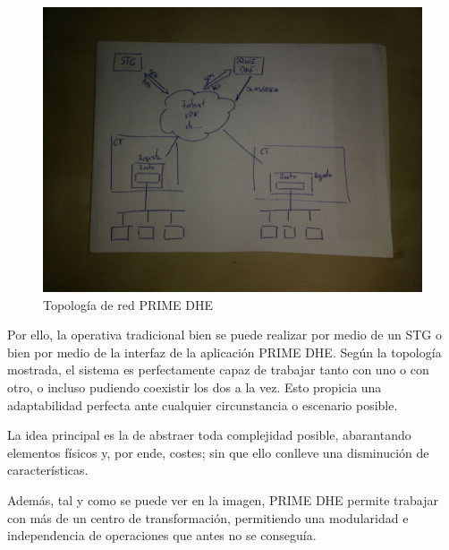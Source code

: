 \begin{figure}[htbp]
	\centering
	\includegraphics[width=\textwidth]{Img/boceto_red_primedhe.jpg}
	\caption{Topología de red PRIME DHE}
	\label{fig:EstructuraPrimeDHE}
\end{figure}

Por ello, la operativa tradicional bien se puede realizar por medio de un STG o bien por medio de la interfaz de la aplicación PRIME DHE. Según la topología mostrada, el sistema es perfectamente capaz de trabajar tanto con uno o con otro, o incluso pudiendo coexistir los dos a la vez. Esto propicia una adaptabilidad perfecta ante cualquier circunstancia o escenario posible.

La idea principal es la de abstraer toda complejidad posible, abarantando elementos físicos y, por ende, costes; sin que ello conlleve una disminución de características.

 Además, tal y como se puede ver en la imagen, PRIME DHE permite trabajar con más de un centro de transformación, permitiendo una modularidad e independencia de operaciones que antes no se conseguía. 





